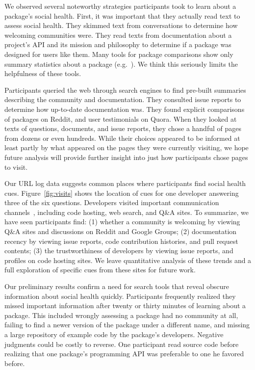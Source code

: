 We observed several noteworthy strategies participants took to learn about a package's social health.
First, it was important that they actually read text to assess social health.
They skimmed text from conversations to determine how welcoming communities were.
They read texts from documentation about a project's API and its mission and philosophy to determine if a package was designed for users like them.
Many tools for package comparisons show only summary statistics about a package (e.g.~\cite{awesome_python,ruby_toolbox}).
We think this seriously limits the helpfulness of these tools.

Participants queried the web through search engines to find pre-built summaries describing the community and documentation.
They consulted issue reports to determine how up-to-date documentation was.
They found explicit comparisons of packages on Reddit, and user testimonials on Quora.
When they looked at texts of questions, documents, and issue reports, they chose a handful of pages from dozens or even hundreds.
While their choices appeared to be informed at least partly by what appeared on the pages they were currently visiting, we hope future analysis will provide further insight into just how participants chose pages to visit.

Our URL log data suggests common places where participants find social health cues.
Figure~\ref{fig:visits} shows the location of cues for one developer answering three of the six questions.
Developers visited important communication channels~\cite{storey_revolution_2014}, including code hosting, web search, and Q\&A sites.
To summarize, we have seen participants find:
(1) whether a community is welcoming by viewing Q\&A sites and discussions on Reddit and Google Groups;
(2) documentation recency by viewing issue reports, code contribution histories, and pull request contents;
(3) the trustworthiness of developers by viewing issue reports, and profiles on code hosting sites.
We leave quantitative analysis of these trends and a full exploration of specific cues from these sites for future work.

Our preliminary results confirm a need for search tools that reveal obscure information about social health quickly.
Participants frequently realized they missed important information after twenty or thirty minutes of learning about a package.
This included wrongly assessing a package had no community at all, failing to find a newer version of the package under a different name, and missing a large repository of example code by the package's developers.
Negative judgments could be costly to reverse.
One participant read source code before realizing that one package's programming API was preferable to one he favored before.

